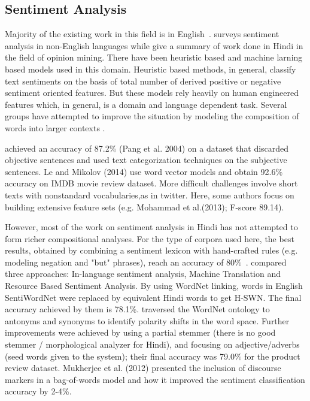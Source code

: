 \documentclass[11pt,a4paper]{article}
\begin{document}
\subsection{Sentiment Analysis}
Majority of the existing work in this field is in English~\cite{Liu:12}. \cite{Medagoda:13} surveys sentiment analysis in non-English languages while \cite{Sharma:14} give a summary of work done in Hindi in the field of opinion mining.
There have been heuristic based and machine larning based models used in this domain. Heuristic based methods, in general, classify text sentiments on the basis of total number of derived positive or negative sentiment oriented features. But these models rely heavily on human engineered features which, in general, is a domain and language dependent task. Several groups have attempted to improve the situation by modeling the composition of words into larger contexts \cite{Le:14,Socher:13,Johnson:14,Baroni:14}.

\cite{Pang:04} achieved an accuracy of 87.2\% (Pang et al. 2004) on a dataset that discarded objective sentences and used text categorization techniques on the subjective sentences. Le and Mikolov (2014) use word vector models and obtain 92.6\% accuracy on IMDB movie review dataset.  More difficult challenges involve short texts with nonstandard vocabularies,as in twitter.  Here, some authors focus on building extensive feature sets (e.g. Mohammad et al.(2013); F-score 89.14).

However, most of the work on sentiment analysis in Hindi has not attempted to form richer compositional analyses. For the type of corpora used here, the best results, obtained by combining a sentiment lexicon with hand-crafted rules (e.g. modeling negation and "but" phrases), reach an accuracy of 80\%~\cite{Mittal:13}. \cite{Joshi:10} compared three approaches: In-language sentiment
analysis, Machine Translation and Resource Based Sentiment Analysis. By using WordNet linking, words in English SentiWordNet were replaced by equivalent Hindi words to get H-SWN. The final accuracy achieved by them is 78.1\%. \cite{Bakliwal:12} traversed the WordNet ontology to antonyms and synonyms to identify polarity shifts in the word space. Further improvements were achieved by using a partial stemmer (there is no good stemmer / morphological analyzer for Hindi), and focusing on adjective/adverbs (seed words given to the system); their final accuracy was 79.0\% for the product review dataset. Mukherjee et al. (2012) presented the inclusion of discourse markers in a bag-of-words model and how it improved the sentiment classification accuracy by 2-4\%.
\end{document}
